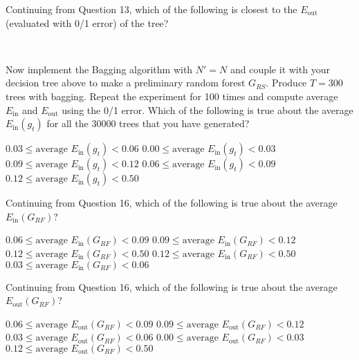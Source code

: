 \documentclass[a4paper,10pt]{exam}
\begin{document}
\begin{questions}
	    \question Continuing from Question 13, which of the following is closest to the $E_{\text{out}}$ (evaluated with 0/1 error) of the tree?
	    \begin{checkboxes}
	    \\
	    \end{checkboxes}
	    
	    \question Now implement the Bagging algorithm with $N' = N$ and couple it with your decision tree above to make a preliminary random forest $G_{RS}$. Produce $T=300$ trees with bagging. Repeat the experiment for 100 times and compute average $E_{\text{in}}$ and $E_{\text{out}}$ using the 0/1 error.
	    Which of the following is true about the average $E_{\text{in}}(g_t)$ for all the 30000 trees that you have generated?
	    \begin{checkboxes}
	    	\CorrectChoice $0.03 \leq \mbox{average } E_{\text{in}}(g_t) <0.06$
	    	\choice $0.00 \leq \mbox{average } E_{\text{in}}(g_t) < 0.03$
	    	\choice $0.09 \leq \mbox{average } E_{\text{in}}(g_t) < 0.12$
	    	\choice $0.06 \leq \mbox{average } E_{\text{in}}(g_t) < 0.09$
	    	\choice $0.12 \leq \mbox{average } E_{\text{in}}(g_t) < 0.50$\\
	    \end{checkboxes}
	    
	    \question Continuing from Question 16, which of the following is true about the average $E_{\text{in}}(G_{RF})$?
	    \begin{checkboxes}
	    	\choice $0.06 \leq \mbox{average } E_{\text{in}}(G_{RF}) < 0.09$
	    	\choice $0.09 \leq \mbox{average } E_{\text{in}}(G_{RF}) < 0.12$
	    	\choice $0.12 \leq \mbox{average } E_{\text{in}}(G_{RF}) < 0.50$
	    	\CorrectChoice $0.12 \leq \mbox{average } E_{\text{in}}(G_{RF}) < 0.50$
	    	\choice $0.03 \leq \mbox{average } E_{\text{in}}(G_{RF}) < 0.06$\\
	    \end{checkboxes}
	    
	    \question Continuing from Question 16, which of the following is true about the average $E_{\text{out}}(G_{RF})$?
	    \begin{checkboxes}
	    	\CorrectChoice $0.06 \leq \mbox{average } E_{\text{out}}(G_{RF}) < 0.09$
	    	\choice $0.09 \leq \mbox{average } E_{\text{out}}(G_{RF}) < 0.12$
	    	\choice $0.03 \leq \mbox{average } E_{\text{out}}(G_{RF}) < 0.06$
	    	\choice $0.00 \leq \mbox{average } E_{\text{out}}(G_{RF}) < 0.03$
	    	\choice $0.12 \leq \mbox{average } E_{\text{out}}(G_{RF}) < 0.50$\\
	    \end{checkboxes}
	    

\end{questions}
\end{document}
